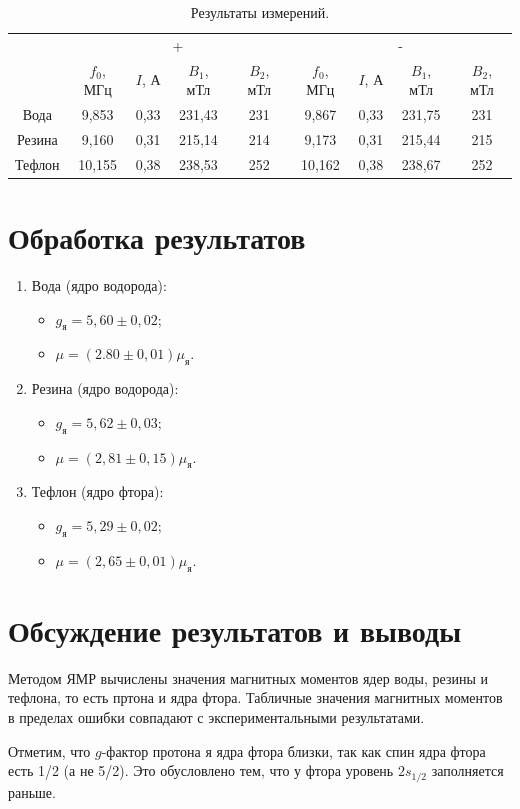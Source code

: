 \documentclass[a4paper,12pt]{article} %
\begin{document}
	\begin{table}[H]
		\caption{Результаты измерений.}
		\label{table:exp1}
		\begin{tabular}{|c|c|c|c|c|c|c|c|c|}
			\hline
			\multirow{2}{*}{} & \multicolumn{4}{c|}{+}                        & \multicolumn{4}{c|}{-}                        \\ \cline{2-9} 
			& $f_0$, МГц & $I$, А & $B_1$, мТл & $B_2$, мТл & $f_0$, МГц & $I$, А & $B_1$, мТл & $B_2$, мТл \\ \hline
			Вода              & 9,853      & 0,33   & 231,43     & 231        & 9,867      & 0,33   & 231,75     & 231        \\ \hline
			Резина            & 9,160      & 0,31   & 215,14     & 214        & 9,173      & 0,31   & 215,44     & 215        \\ \hline
			Тефлон            & 10,155     & 0,38   & 238,53     & 252        & 10,162     & 0,38   & 238,67     & 252        \\ \hline
		\end{tabular}
	\end{table}
	
	\section{Обработка результатов}
		\begin{enumerate}
			\item
				Вода (ядро водорода):
				\begin{itemize}
					\item
						$g_\text{я} = 5,60 \pm 0,02$;
					\item
						$\mu = (2.80 \pm 0,01) \mu_\text{я}$.
				\end{itemize}
			\item
				Резина (ядро водорода):
				\begin{itemize}
					\item
						$g_\text{я} = 5,62 \pm 0,03$;
					\item
						$\mu = (2,81 \pm 0,15)\mu_\text{я}$.
				\end{itemize}
			\item
				Тефлон (ядро фтора):
				\begin{itemize}
					\item
						$g_\text{я} = 5,29 \pm 0,02$;
					\item
						$\mu = (2,65 \pm 0,01)\mu_{\text{я}}$.
				\end{itemize}
		\end{enumerate}
	
	\section{Обсуждение результатов и выводы}
		Методом ЯМР вычислены значения магнитных моментов ядер воды, резины и тефлона, то есть пртона и ядра фтора. Табличные значения магнитных моментов в пределах ошибки совпадают с экспериментальными результатами.
		
		Отметим, что $g$-фактор протона я ядра фтора близки, так как спин ядра фтора есть 1/2 (а не 5/2). Это обусловлено тем, что у фтора уровень $2s_{1/2}$ заполняется раньше.
	
	
\end{document}

